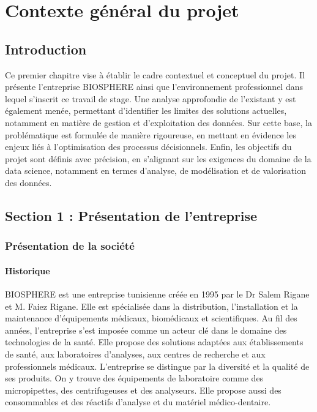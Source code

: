 \newpage
\pagestyle{fancy}
\renewcommand{\headrulewidth}{0.5pt}
\renewcommand{\footrulewidth}{0.5pt}
\chapter{Contexte général du projet}\setlength{\headheight}{28pt}
\label{ch1}
\minitoc
\newpage

\section{Introduction}
Ce premier chapitre vise à établir le cadre contextuel et conceptuel du projet. Il présente l’entreprise BIOSPHERE ainsi que l’environnement professionnel dans lequel s’inscrit ce travail de stage. Une analyse approfondie de l’existant y est également menée, permettant d’identifier les limites des solutions actuelles, notamment en matière de gestion et d’exploitation des données. Sur cette base, la problématique est formulée de manière rigoureuse, en mettant en évidence les enjeux liés à l’optimisation des processus décisionnels. Enfin, les objectifs du projet sont définis avec précision, en s’alignant sur les exigences du domaine de la data science, notamment en termes d’analyse, de modélisation et de valorisation des données.

\section{Section 1 : Présentation de l'entreprise}
\subsection{Présentation de la société}
\subsubsection{Historique}
BIOSPHERE est une entreprise tunisienne créée en 1995 par le Dr Salem Rigane et M. Faiez Rigane. Elle est spécialisée dans la distribution, l'installation et la maintenance d'équipements médicaux, biomédicaux et scientifiques. Au fil des années, l'entreprise s'est imposée comme un acteur clé dans le domaine des technologies de la santé. Elle propose des solutions adaptées aux établissements de santé, aux laboratoires d'analyses, aux centres de recherche et aux professionnels médicaux. L'entreprise se distingue par la diversité et la qualité de ses produits. On y trouve des équipements de laboratoire comme des micropipettes, des centrifugeuses et des analyseurs. Elle propose aussi des consommables et des réactifs d'analyse et du matériel médico-dentaire.

